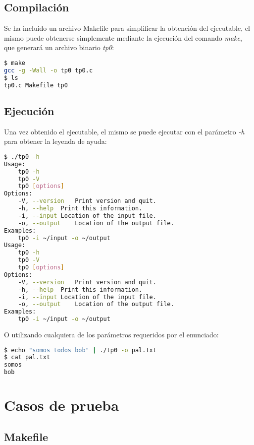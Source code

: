 \documentclass[10pt,a4paper]{article}
\begin{document}
\subsection{Compilación}

\lstset{
	breaklines=true,
  	basicstyle=\footnotesize,
}

Se ha incluido un archivo Makefile para simplificar la obtención del ejecutable, el mismo puede obtenerse simplemente mediante la ejecución del comando \textit{make}, que generará un archivo binario \textit{tp0}:

\begin{lstlisting}[language=bash]
$ make
gcc -g -Wall -o tp0 tp0.c 
$ ls
tp0.c Makefile tp0 
\end{lstlisting}

\subsection{Ejecución}

Una vez obtenido el ejecutable, el mismo se puede ejecutar con el parámetro \textit{-h} para obtener la leyenda de ayuda:

\begin{lstlisting}[language=bash]
$ ./tp0 -h
Usage:
	tp0 -h
	tp0 -V
	tp0 [options]
Options:
	-V, --version	Print version and quit.
	-h, --help	Print this information.
	-i, --input	Location of the input file.
	-o, --output	Location of the output file.
Examples:
	tp0 -i ~/input -o ~/output
Usage:
	tp0 -h
	tp0 -V
	tp0 [options]
Options:
	-V, --version	Print version and quit.
	-h, --help	Print this information.
	-i, --input	Location of the input file.
	-o, --output	Location of the output file.
Examples:
	tp0 -i ~/input -o ~/output

\end{lstlisting}

O utilizando cualquiera de los parámetros requeridos por el enunciado:

\begin{lstlisting}[language=bash]
$ echo "somos todos bob" | ./tp0 -o pal.txt
$ cat pal.txt
somos
bob
\end{lstlisting}

\newpage

\section{Casos de prueba}

\subsection{Makefile}
\end{document}
